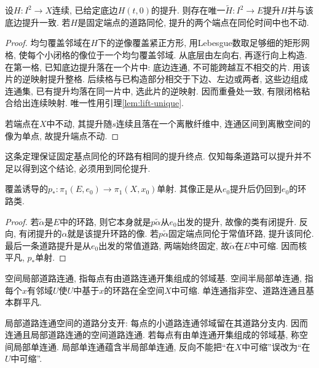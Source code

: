 \begin{theorem}[环路同伦提升]\label{thm:cover-homotopy-lift}
设$H:I^2\to X$连续, 已给定底边$H(t,0)$的提升. 则存在唯一$\widetilde H:I^2\to E$提升$H$并与该底边提升一致. 若$H$是固定端点的道路同伦, 提升的两个端点在同伦时间中也不动.
\end{theorem}
\begin{proof}
均匀覆盖邻域在$H$下的逆像覆盖紧正方形, 用Lebesgue数取足够细的矩形网格, 使每个小闭格的像位于一个均匀覆盖邻域. 从底层由左向右, 再逐行向上构造. 在第一格, 已知底边提升落在一个片中: 底边连通, 不可能跨越互不相交的片. 用该片的逆映射提升整格. 后续格与已构造部分相交于下边、左边或两者, 这些边组成连通集, 已有提升均落在同一片中, 选此片的逆映射. 因而重叠处一致, 有限闭格粘合给出连续映射. 唯一性用引理\ref{lem:lift-unique}.

若端点在$X$中不动, 其提升随$s$连续且落在一个离散纤维中, 连通区间到离散空间的像为单点, 故提升端点不动.
\end{proof}
这条定理保证固定基点同伦的环路有相同的提升终点. 仅知每条道路可以提升并不足以得到这个结论, 必须用到同伦提升.

\begin{theorem}\label{thm:cover-injective}
覆盖诱导的$p_*:\pi_1(E,e_0)\to\pi_1(X,x_0)$单射. 其像正是从$e_0$提升后仍回到$e_0$的环路类.
\end{theorem}
\begin{proof}
若$\widetilde\alpha$是$E$中的环路, 则它本身就是$p\widetilde\alpha$从$e_0$出发的提升, 故像的类有闭提升. 反向, 有闭提升的$\alpha$就是该提升环路的像. 若$p\widetilde\alpha$固定端点同伦于常值环路, 提升该同伦. 最后一条道路提升是从$e_0$出发的常值道路, 两端始终固定, 故$\widetilde\alpha$在$E$中可缩. 因而核平凡, $p_*$单射.
\end{proof}

\begin{definition}
空间局部道路连通, 指每点有由道路连通开集组成的邻域基. 空间半局部单连通, 指每个$x$有邻域$U$使$U$中基于$x$的环路在全空间$X$中可缩. 单连通指非空、道路连通且基本群平凡.
\end{definition}
局部道路连通空间的道路分支开: 每点的小道路连通邻域留在其道路分支内. 因而连通且局部道路连通的空间道路连通. 若每点有由单连通开集组成的邻域基, 称空间局部单连通. 局部单连通蕴含半局部单连通, 反向不能把“在$X$中可缩”误改为“在$U$中可缩”.

